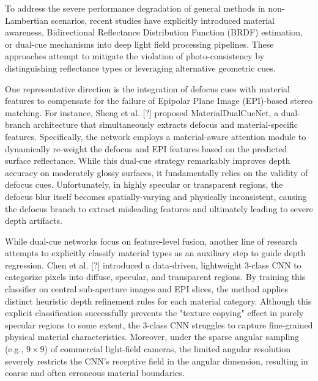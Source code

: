 To address the severe performance degradation of general methods in non-Lambertian scenarios, recent studies have explicitly introduced material awareness, Bidirectional Reflectance Distribution Function (BRDF) estimation, or dual-cue mechanisms into deep light field processing pipelines. These approaches attempt to mitigate the violation of photo-consistency by distinguishing reflectance types or leveraging alternative geometric cues.

One representative direction is the integration of defocus cues with material features to compensate for the failure of Epipolar Plane Image (EPI)-based stereo matching. For instance, Sheng et al. [?] proposed MaterialDualCueNet, a dual-branch architecture that simultaneously extracts defocus and material-specific features. Specifically, the network employs a material-aware attention module to dynamically re-weight the defocus and EPI features based on the predicted surface reflectance. While this dual-cue strategy remarkably improves depth accuracy on moderately glossy surfaces, it fundamentally relies on the validity of defocus cues. Unfortunately, in highly specular or transparent regions, the defocus blur itself becomes spatially-varying and physically inconsistent, causing the defocus branch to extract misleading features and ultimately leading to severe depth artifacts.

While dual-cue networks focus on feature-level fusion, another line of research attempts to explicitly classify material types as an auxiliary step to guide depth regression. Chen et al. [?] introduced a data-driven, lightweight 3-class CNN to categorize pixels into diffuse, specular, and transparent regions. By training this classifier on central sub-aperture images and EPI slices, the method applies distinct heuristic depth refinement rules for each material category. Although this explicit classification successfully prevents the "texture copying" effect in purely specular regions to some extent, the 3-class CNN struggles to capture fine-grained physical material characteristics. Moreover, under the sparse angular sampling (e.g., $9 \times 9$) of commercial light-field cameras, the limited angular resolution severely restricts the CNN's receptive field in the angular dimension, resulting in coarse and often erroneous material boundaries.

